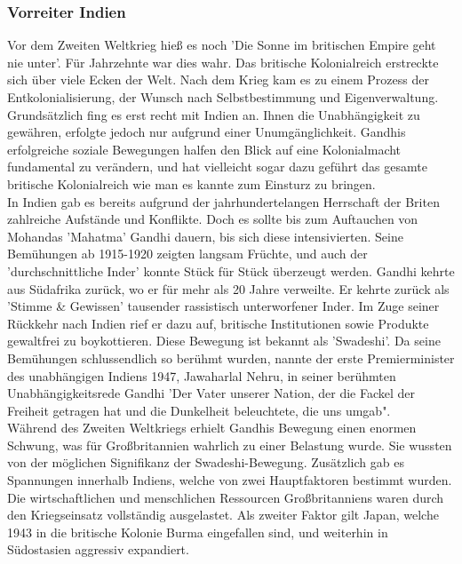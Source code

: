 \documentclass[letterpaper, 12pt]{article}
\let\tempsubsubsection\subsubsection
\renewcommand\subsubsection[1]{\vspace{0cm}\tempsubsubsection{#1}\vspace{0cm}}
\begin{document}
\subsubsection{Vorreiter Indien}

Vor dem Zweiten Weltkrieg hieß es noch 'Die Sonne im britischen Empire geht nie unter'. Für Jahrzehnte war dies wahr. Das britische Kolonialreich erstreckte sich über viele Ecken der Welt. Nach dem Krieg kam es zu einem Prozess der Entkolonialisierung, der Wunsch nach Selbstbestimmung und Eigenverwaltung. \\
Grundsätzlich fing es erst recht mit Indien an. Ihnen die Unabhängigkeit zu gewähren, erfolgte jedoch nur aufgrund einer Unumgänglichkeit. Gandhis erfolgreiche soziale Bewegungen halfen den Blick auf eine Kolonialmacht fundamental zu verändern, und hat vielleicht sogar dazu geführt das gesamte britische Kolonialreich wie man es kannte zum Einsturz zu bringen. \\
In Indien gab es bereits aufgrund der jahrhundertelangen Herrschaft der Briten zahlreiche Aufstände und Konflikte. Doch es sollte bis zum Auftauchen von Mohandas 'Mahatma' Gandhi dauern, bis sich diese intensivierten. Seine Bemühungen ab 1915-1920 zeigten langsam Früchte, und auch der 'durchschnittliche Inder' konnte Stück für Stück überzeugt werden. \clearpage
Gandhi kehrte aus Südafrika zurück, wo er für mehr als 20 Jahre verweilte. Er kehrte zurück als 'Stimme \& Gewissen' tausender rassistisch unterworfener Inder. Im Zuge seiner Rückkehr nach Indien rief er dazu auf, britische Institutionen sowie Produkte gewaltfrei zu boykottieren. Diese Bewegung ist bekannt als 'Swadeshi'. Da seine Bemühungen schlussendlich so berühmt wurden, nannte der erste Premierminister des unabhängigen Indiens 1947, Jawaharlal Nehru, in seiner berühmten Unabhängigkeitsrede Gandhi 'Der Vater unserer Nation, der die Fackel der Freiheit getragen hat und die Dunkelheit beleuchtete, die uns umgab". \\
Während des Zweiten Weltkriegs erhielt Gandhis Bewegung einen enormen Schwung, was für Großbritannien wahrlich zu einer Belastung wurde. Sie wussten von der möglichen Signifikanz der Swadeshi-Bewegung. Zusätzlich gab es Spannungen innerhalb Indiens, welche von zwei Hauptfaktoren bestimmt wurden. Die wirtschaftlichen und menschlichen Ressourcen Großbritanniens waren durch den Kriegseinsatz vollständig ausgelastet. Als zweiter Faktor gilt Japan, welche 1943 in die britische Kolonie Burma eingefallen sind, und weiterhin in Südostasien aggressiv expandiert. \\
\end{document}
